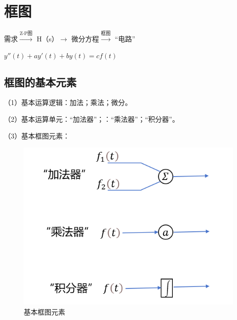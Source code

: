 \documentclass[UTF8]{ctexart}
\begin{document}
\section{框图}
需求$ \xrightarrow{\text{Z-P图}} $ H（s）$\longrightarrow $ 微分方程$ \xrightarrow{\text{框图}} $ “电路”\par
$y''(t) + ay'(t) + by(t) = cf(t)$ \par
\subsection{框图的基本元素}
（1）基本运算逻辑：加法；乘法；微分。 \par
（2）基本运算单元：“加法器”；：“乘法器”；“积分器”。 \par
（3）基本框图元素：\par
\begin{figure}[h]
    \centering         %
    \includegraphics[scale=0.45]{6.png}
    \caption{基本框图元素}
\end{figure}
\end{document}
